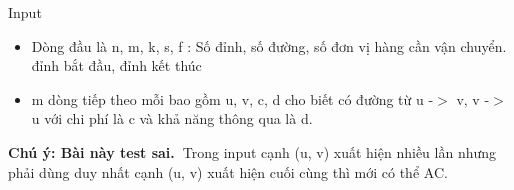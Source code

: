 Input
\begin{itemize}
	\item Dòng đầu là n, m, k, s, f : Số đỉnh, số đường, số đơn vị hàng cần vận chuyển. đỉnh bắt đầu, đỉnh kết thúc
	\item m dòng tiếp theo mỗi bao gồm u, v, c, d cho biết có đường từ u -$>$ v, v -$>$ u với chi phí là c và khả năng thông qua là d.
\end{itemize}

\textbf{Chú ý: Bài này test sai. }Trong input cạnh (u, v) xuất hiện nhiều lần nhưng phải dùng duy nhất cạnh (u, v) xuất hiện cuối cùng thì mới có thể AC.